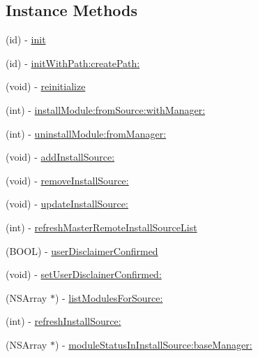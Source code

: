 \subsection*{Instance Methods}
\begin{DoxyCompactItemize}
\item 
(id) -\/ \hyperlink{interface_sword_install_source_controller_a4213bb26f5207ee3f402fe463badc691}{init}
\item 
(id) -\/ \hyperlink{interface_sword_install_source_controller_a1c7586c200f27d254bc5f87a642f9d98}{init\-With\-Path\-:create\-Path\-:}
\item 
(void) -\/ \hyperlink{interface_sword_install_source_controller_ad9882f00bb27345adbf4a46a7ac4124e}{reinitialize}
\item 
(int) -\/ \hyperlink{interface_sword_install_source_controller_a1b68464f8a8a00e7723b83206fa66d15}{install\-Module\-:from\-Source\-:with\-Manager\-:}
\item 
(int) -\/ \hyperlink{interface_sword_install_source_controller_aac5b6f9e2c3c252208c8aa8c37c308b3}{uninstall\-Module\-:from\-Manager\-:}
\item 
(void) -\/ \hyperlink{interface_sword_install_source_controller_a9fcda3748b03ff5d5be26a88650bdb0b}{add\-Install\-Source\-:}
\item 
(void) -\/ \hyperlink{interface_sword_install_source_controller_a740957e920ffb62d23ef07f8eaf55850}{remove\-Install\-Source\-:}
\item 
(void) -\/ \hyperlink{interface_sword_install_source_controller_aa51ec2e7308a6e712c4c0bf51a64c634}{update\-Install\-Source\-:}
\item 
(int) -\/ \hyperlink{interface_sword_install_source_controller_af21ad528181938a899e9ebca5fad59f5}{refresh\-Master\-Remote\-Install\-Source\-List}
\item 
(B\-O\-O\-L) -\/ \hyperlink{interface_sword_install_source_controller_a226132888becfb860c7aebefc433070d}{user\-Disclaimer\-Confirmed}
\item 
(void) -\/ \hyperlink{interface_sword_install_source_controller_a64c94dd1b2827b993c2845de98c8412c}{set\-User\-Disclainer\-Confirmed\-:}
\item 
(N\-S\-Array $\ast$) -\/ \hyperlink{interface_sword_install_source_controller_a3ed29be1759755d5096b0c42fc67184c}{list\-Modules\-For\-Source\-:}
\item 
(int) -\/ \hyperlink{interface_sword_install_source_controller_a906eb9828c017101ea26f1de0aed9084}{refresh\-Install\-Source\-:}
\item 
(N\-S\-Array $\ast$) -\/ \hyperlink{interface_sword_install_source_controller_a47de4810e407c27e5903c9a02464055a}{module\-Status\-In\-Install\-Source\-:base\-Manager\-:}
\end{DoxyCompactItemize}
